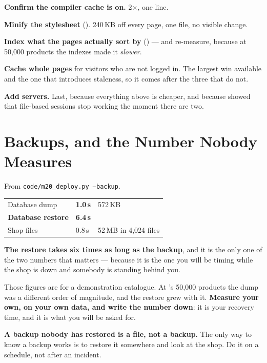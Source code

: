 \begin{conceptbox}
\begin{tightnum}
  \item \textbf{Confirm the compiler cache is on.} 2$\times$, one line.
  \item \textbf{Minify the stylesheet} (). 240\,KB off every page,
        one file, no visible change.
  \item \textbf{Index what the pages actually sort by} () ---
        and re-measure, because at 50{,}000 products the indexes made it
        \emph{slower}.
  \item \textbf{Cache whole pages} for visitors who are not logged in. The
        largest win available and the one that introduces staleness, so it
        comes after the three that do not.
  \item \textbf{Add servers.} Last, because everything above is cheaper, and
        because  showed that file-based sessions stop working the
        moment there are two.
\end{tightnum}
\end{conceptbox}

\section{Backups, and the Number Nobody Measures}

\begin{measured}
From \texttt{code/m20\_deploy.py --backup}.

\smallskip
\begin{tabular}{@{}L{5.0cm}L{3.2cm}L{5.4cm}@{}}
Database dump & \textbf{1.0\,s} & 572\,KB \\
\textbf{Database restore} & \textbf{6.4\,s} & \\
Shop files & 0.8\,s & 52\,MB in 4{,}024 files \\
\end{tabular}

\smallskip
\textbf{The restore takes six times as long as the backup}, and it is the only
one of the two numbers that matters --- because it is the one you will be
timing while the shop is down and somebody is standing behind you.

\smallskip
Those figures are for a demonstration catalogue. At 's 50{,}000
products the dump was a different order of magnitude, and the restore grew with
it. \textbf{Measure your own, on your own data, and write the number down}: it
is your recovery time, and it is what you will be asked for.

\smallskip
\textbf{A backup nobody has restored is a file, not a backup.} The only way to
know a backup works is to restore it somewhere and look at the shop. Do it on a
schedule, not after an incident.
\end{measured}

